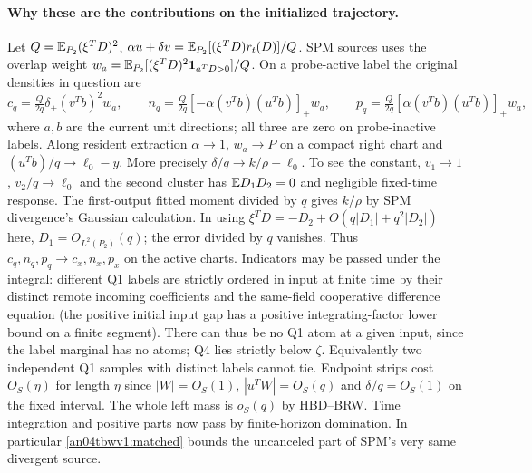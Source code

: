 \documentclass[11pt]{article}
\begin{document}
\paragraph{Why these are the contributions on the initialized trajectory.}
Let $Q=\mathbb E_{P_2}(\xi^TD)^2$, $\alpha u+\delta v=
\mathbb E_{P_2}[(\xi^TD)r_t(D)]/Q$. SPM sources uses the overlap weight
$w_a=\mathbb E_{P_2}[(\xi^TD)^2{\bf1}_{a^TD>0}]/Q$.
On a probe-active label the original densities in question are
\[
 c_q=\tfrac Q{2q}\delta_+(v^Tb)^2w_a,\qquad
 n_q=\tfrac Q{2q}[-\alpha(v^Tb)(u^Tb)]_+w_a,\qquad
 p_q=\tfrac Q{2q}[\alpha(v^Tb)(u^Tb)]_+w_a,
\]
where $a,b$ are the current unit directions; all three are zero
on probe-inactive labels. Along resident extraction
$\alpha\to1$, $w_a\to P$ on a compact right chart and
$(u^Tb)/q\to\ell_0-y$. More precisely $\delta/q\to k/\rho-\ell_0$.
To see the constant, $v_1\to1$, $v_2/q\to\ell_0$ and the second
cluster has $\mathbb E D_1D_2=0$ and negligible fixed-time response.
The first-output fitted moment divided by $q$ gives $k/\rho$
by SPM divergence's Gaussian calculation. In using
$\xi^TD=-D_2+O(q|D_1|+q^2|D_2|)$ here, $D_1=O_{L^2(P_2)}(q)$;
the error divided by $q$ vanishes. Thus $c_q,n_q,p_q\to c_x,n_x,p_x$
on the active charts. Indicators may be passed under the integral:
different Q1 labels are strictly ordered in input at finite time
by their distinct remote incoming coefficients and the same-field
cooperative difference equation (the positive initial input gap
has a positive integrating-factor lower bound on a finite segment).
There can thus be no Q1 atom at a given input, since the label marginal
has no atoms; Q4 lies strictly below $\zeta$. Equivalently two
independent Q1 samples with distinct labels cannot tie.
Endpoint strips cost $O_S(\eta)$ for length $\eta$ since
$|W|=O_S(1)$, $|u^TW|=O_S(q)$ and $\delta/q=O_S(1)$ on the
fixed interval. The whole left mass is $o_S(q)$ by HBD--BRW.
Time integration and positive parts now pass by finite-horizon
domination. In particular \eqref{an04tbwv1:matched} bounds the
uncanceled part of SPM's very same divergent source.
\end{document}
